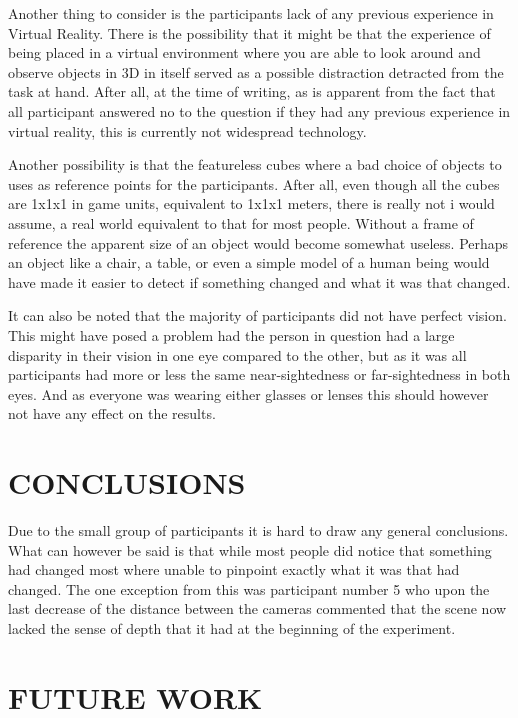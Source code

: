 \documentclass[tog]{acmsiggraph}
\begin{document}
Another thing to consider is the participants lack of any previous experience in Virtual Reality. There is the possibility that it might be that the experience of being placed in a virtual environment where you are able to look around and observe objects in 3D in itself served as a possible distraction detracted from the task at hand. After all, at the time of writing, as is apparent from the fact that all participant answered no to the question if they had any previous experience in virtual reality, this is currently not widespread technology. 

 Another possibility is that the featureless cubes where a bad choice of objects to uses as reference points for the participants. After all, even though all the cubes are 1x1x1 in game units, equivalent to 1x1x1 meters, there is really not i would assume, a real world equivalent to that for most people. Without a frame of reference the apparent size of an object would become somewhat useless. Perhaps an object like a chair, a table, or even a simple model of a human being would have made it easier to detect if something changed and what it was that changed. 
 
 It can also be noted that the majority of participants did not have perfect vision. This might have posed a problem had the person in question had a large disparity in their vision in one eye compared to the other, but as it was all participants had more or less the same near-sightedness or far-sightedness in both eyes. And as everyone was wearing either glasses or lenses this should however not have any effect on the results. 
 
\section{CONCLUSIONS}
Due to the small group of participants it is hard to draw any general conclusions. What can however be said is that while most people did notice that something had changed most where unable to pinpoint exactly what it was that had changed. The one exception from this was participant number 5 who upon the last decrease of the distance between the cameras commented that the scene now lacked the sense of depth that it had at the beginning of the experiment.



\section{FUTURE WORK}
\end{document}
